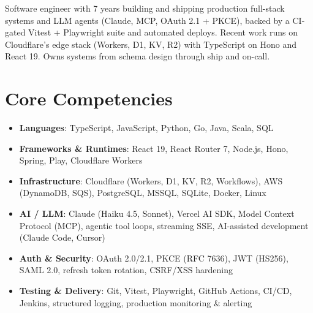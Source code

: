 \documentclass[11pt,a4paper,sans]{moderncv}
\begin{document}
\makecvtitle


\vspace{6pt}
\small{Software engineer with 7 years building and shipping production full-stack systems and LLM agents (Claude, MCP, OAuth 2.1 + PKCE), backed by a CI-gated Vitest + Playwright suite and automated deploys. Recent work runs on Cloudflare's edge stack (Workers, D1, KV, R2) with TypeScript on Hono and React 19. Owns systems from schema design through ship and on-call.}


\section{Core Competencies}
\vspace{1pt}
\begin{itemize}

\item \textbf{Languages}: TypeScript, JavaScript, Python, Go, Java, Scala, SQL

\item \textbf{Frameworks \& Runtimes}: React 19, React Router 7, Node.js, Hono, Spring, Play, Cloudflare Workers

\item \textbf{Infrastructure}: Cloudflare (Workers, D1, KV, R2, Workflows), AWS (DynamoDB, SQS), PostgreSQL, MSSQL, SQLite, Docker, Linux

\item \textbf{AI / LLM}: Claude (Haiku 4.5, Sonnet), Vercel AI SDK, Model Context Protocol (MCP), agentic tool loops, streaming SSE, AI-assisted development (Claude Code, Cursor)

\item \textbf{Auth \& Security}: OAuth 2.0/2.1, PKCE (RFC 7636), JWT (HS256), SAML 2.0, refresh token rotation, CSRF/XSS hardening

\item \textbf{Testing \& Delivery}: Git, Vitest, Playwright, GitHub Actions, CI/CD, Jenkins, structured logging, production monitoring \& alerting

\end{itemize}
\end{document}
